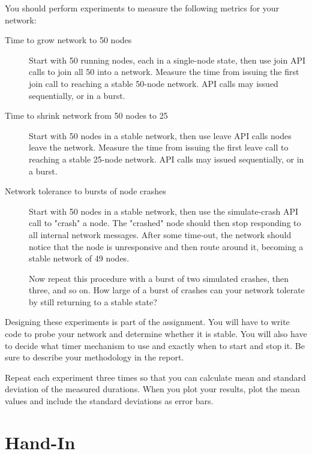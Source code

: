 \documentclass[]{article}
\begin{document}
You should perform experiments to measure the following metrics for your network:

\begin{description}
    \item[Time to grow network to 50 nodes]

        Start with 50 running nodes, each in a single-node state,
        then use join API calls to join all 50 into a network.
        Measure the time from issuing the first join call to reaching a stable 50-node network.
        API calls may issued sequentially, or in a burst.

    \item[Time to shrink network from 50 nodes to 25]

        Start with 50 nodes in a stable network,
        then use leave API calls nodes leave the network.
        Measure the time from issuing the first leave call to reaching a stable 25-node network.
        API calls may issued sequentially, or in a burst.

    \item[Network tolerance to bursts of node crashes]

        Start with 50 nodes in a stable network,
        then use the simulate-crash API call to "crash" a node.
        The "crashed" node should then stop responding to all internal network messages.
        After some time-out, the network should notice that the node is unresponsive and then route around it,
        becoming a stable network of 49 nodes.

        Now repeat this procedure with a burst of two simulated crashes, then three, and so on.
        How large of a burst of crashes can your network tolerate by still returning to a stable state?

\end{description}

Designing these experiments is part of the assignment.
You will have to write code to probe your network and determine whether it is stable.
You will also have to decide what timer mechanism to use and exactly when to start and stop it.
Be sure to describe your methodology in the report.

Repeat each experiment three times so that you can calculate mean and standard deviation of the measured durations.
When you plot your results, plot the mean values and include the standard deviations as error bars.

\section{Hand-In}
\end{document}
